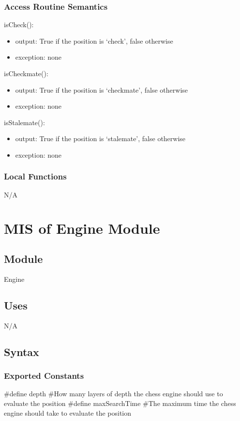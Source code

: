 \documentclass[12pt, titlepage]{article}
\begin{document}
    \subsubsection{Access Routine Semantics}
        \noindent isCheck():
        \begin{itemize}
            \item output: True if the position is `check', false otherwise
            \item exception: none
        \end{itemize}

        \noindent isCheckmate():
        \begin{itemize}
            \item output: True if the position is `checkmate', false otherwise
            \item exception: none
        \end{itemize}

        \noindent isStalemate():
        \begin{itemize}
            \item output: True if the position is `stalemate', false otherwise
            \item exception: none
        \end{itemize}

    \subsubsection{Local Functions}
    N/A

\newpage

\section{MIS of Engine Module} \label{mEngine}
    \subsection{Module}
    Engine

    \subsection{Uses}
    N/A

    \subsection{Syntax}
    \subsubsection{Exported Constants}
    \#define depth \#How many layers of depth the chess engine should use to evaluate the position
    \#define maxSearchTime \#The maximum time the chess engine should take to evaluate the position
    
\end{document}

